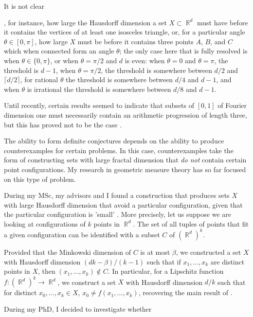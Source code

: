 \documentclass[12pt]{article}
\DeclareMathOperator{\RR}{\mathbb{R}}
\begin{document}
 It is not clear

, for instance, how large the Hausdorff dimension a set $X \subset \RR^d$ must have before it contains the vertices of at least one isosceles triangle, or, for a particular angle $\theta \in [0,\pi]$, how large $X$ must be before it contains three points $A$, $B$, and $C$ which when connected form an angle $\theta$; the only case here that is fully resolved is when $\theta \in \{ 0, \pi \}$, or when $\theta = \pi/2$ and $d$ is even: when $\theta = 0$ and $\theta = \pi$, the threshold is $d-1$, when $\theta = \pi/2$, the threshold is somewhere between $d/2$ and $\lceil d/2 \rceil$, for rational $\theta$ the threshold is somewhere between $d/4$ and $d-1$, and when $\theta$ is irrational the threshold is somewhere between $d/8$ and $d-1$.

Until recently, certain results \cite{LabaPramanik} seemed to indicate that subsets of $[0,1]$ of Fourier dimension one must necessarily contain an arithmetic progression of length three, but this has proved not to be the case \cite{Schmerkin}.

The ability to form definite conjectures depends on the ability to produce counterexamples for certain problems. In this case, counterexamples take the form of constructing sets with large fractal dimension that \emph{do not} contain certain point configurations. My research in geometric measure theory has so far focused on this type of problem.

During my MSc, my advisors and I found a construction that produces sets $X$ with large Hausdorff dimension that avoid a particular configuration, given that the particular configuration is 'small' \cite{DensonPramanikZahl}. More precisely, let us suppose we are looking at configurations of $k$ points in $\RR^d$. The set of all tuples of points that fit a given configuration can be identified with a subset $C$ of $(\RR^d)^k$.

Provided that the Minkowski dimension of $C$ is at most $\beta$, we constructed a set $X$ with Hausdorff dimension $(dk - \beta)/(k-1)$ such that if $x_1,\dots,x_k$ are distinct points in $X$, then $(x_1,\dots,x_k) \not \in C$. In particular, for a Lipschitz function $f: (\RR^d)^k \to \RR^d$, we construct a set $X$ with Hausdorff dimension $d/k$ such that for distinct $x_0,\dots,x_k \in X$, $x_0 \neq f(x_1,\dots,x_k)$, recovering the main result of \cite{FraserPramanik}.



During my PhD, I decided to investigate whether 
\end{document}
